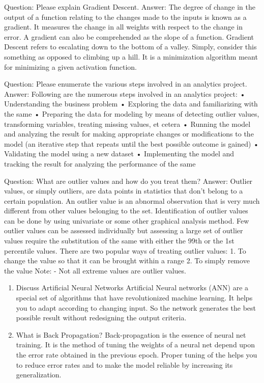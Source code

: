 \documentclass[
]{book}
\begin{document}
Question: Please explain Gradient Descent.
Answer: The degree of change in the output of a function relating to the changes made to the inputs is known as a gradient. It measures the change in all weights with respect to the change in error. A gradient can also be comprehended as the slope of a function.
Gradient Descent refers to escalating down to the bottom of a valley. Simply, consider this something as opposed to climbing up a hill. It is a minimization algorithm meant for minimizing a given activation function.

Question: Please enumerate the various steps involved in an analytics project.
Answer: Following are the numerous steps involved in an analytics project:
• Understanding the business problem
• Exploring the data and familiarizing with the same
• Preparing the data for modeling by means of detecting outlier values, transforming variables, treating missing values, et cetera
• Running the model and analyzing the result for making appropriate changes or modifications to the model (an iterative step that repeats until the best possible outcome is gained)
• Validating the model using a new dataset
• Implementing the model and tracking the result for analyzing the performance of the same

Question: What are outlier values and how do you treat them?
Answer: Outlier values, or simply outliers, are data points in statistics that don't belong to a certain population. An outlier value is an abnormal observation that is very much different from other values belonging to the set.
Identification of outlier values can be done by using univariate or some other graphical analysis method. Few outlier values can be assessed individually but assessing a large set of outlier values require the substitution of the same with either the 99th or the 1st percentile values.
There are two popular ways of treating outlier values:
1. To change the value so that it can be brought within a range
2. To simply remove the value
Note: - Not all extreme values are outlier values.

\begin{enumerate}
\def\labelenumi{\arabic{enumi}.}
\setcounter{enumi}{20}
\item
  Discuss Artificial Neural Networks
  Artificial Neural networks (ANN) are a special set of algorithms that have revolutionized machine learning. It helps you to adapt according to changing input. So the network generates the best possible result without redesigning the output criteria.
\item
  What is Back Propagation?
  Back-propagation is the essence of neural net training. It is the method of tuning the weights of a neural net depend upon the error rate obtained in the previous epoch. Proper tuning of the helps you to reduce error rates and to make the model reliable by increasing its generalization.
\end{enumerate}
\end{document}
